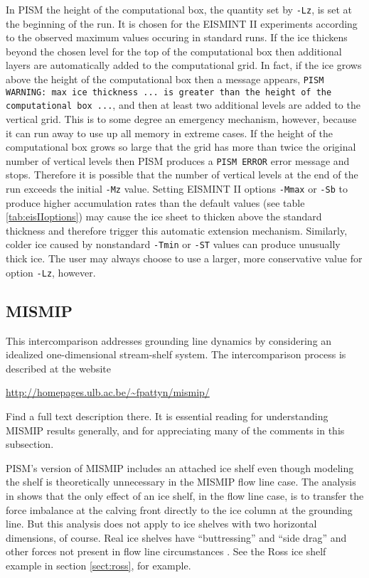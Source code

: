 In PISM the height of the computational box, the quantity set by \verb|-Lz|, is set at the beginning of the run.  It is chosen for the EISMINT II experiments according to the observed maximum values occuring in standard runs.  If the ice thickens beyond the chosen level for the top of the computational box then additional layers are automatically added to the computational grid.  In fact, if the ice grows above the height of the computational box then a message appears, \texttt{PISM WARNING: max ice thickness ... is greater than the height of the computational box ...}, and then at least two additional levels are added to the vertical grid.  This is to some degree an emergency mechanism, however, because it can run away to use up all memory in extreme cases.  If the height of the computational box grows so large that the grid has more than twice the original number of vertical levels then PISM produces a \texttt{PISM ERROR} error message and stops.   Therefore it is possible that the number of vertical levels at the end of the run exceeds the initial \verb|-Mz| value.  Setting EISMINT II options \verb|-Mmax| or \verb|-Sb| to produce higher accumulation rates than the default values (see table \ref{tab:eisIIoptions}) may cause the ice sheet to thicken above the standard thickness and therefore trigger this automatic extension mechanism.  Similarly, colder ice caused by nonstandard \verb|-Tmin| or \verb|-ST| values can produce unusually thick ice.  The user may always choose to use a larger, more conservative value for option \verb|-Lz|, however.


\subsection{MISMIP}\label{subsect:MISMIP}
\renewcommand{\optindexsection}{MISMIP}

This intercomparison addresses grounding line dynamics by considering an idealized one-dimensional stream-shelf system.  The intercomparison process is described at the website

\centerline{\url{http://homepages.ulb.ac.be/~fpattyn/mismip/}}

\noindent Find a full text description there.  It is essential reading for understanding MISMIP results generally, and for appreciating many of the comments in this subsection.

PISM's version of MISMIP includes an attached ice shelf even though modeling the shelf is theoretically unnecessary in the MISMIP flow line case.  The analysis in \cite{SchoofMarine1} shows that the only effect of an ice shelf, in the flow line case, is to transfer the force imbalance at the calving front directly to the ice column at the grounding line.  But this analysis does not apply to ice shelves with two horizontal dimensions, of course.  Real ice shelves have ``buttressing'' and ``side drag'' and other forces not present in flow line circumstances \cite{Goldbergetal2009}.  See the Ross ice shelf example in section \ref{sect:ross}, for example.


